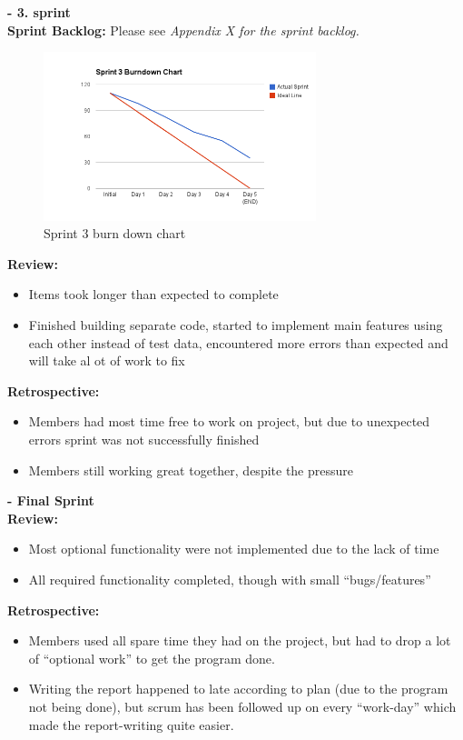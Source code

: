 \documentclass[11pt]{article}
\begin{document}
\textbf{- 3. sprint} \\

\textbf{Sprint Backlog:} Please see \emph{Appendix X for the sprint backlog.}
\begin{figure}[H]
  		\centering
    	\includegraphics[width=300px]{images/SCRUM/Sprint 3 burndown chart.png}
    	\caption{Sprint 3 burn down chart}
\end{figure}

     \textbf{Review:}
\begin{itemize}
\item Items took longer than expected to complete
\item Finished building separate code, started to implement main features using each other
       instead of test data, encountered more errors than expected and will take al ot of
       work to fix
\end{itemize}

     \textbf{Retrospective:}
\begin{itemize}
\item Members had most time free to work on project, but due to unexpected errors
       sprint was not successfully finished
\item Members still working great together, despite the pressure
\end{itemize}


\textbf{- Final Sprint} \\
\textbf{Review:}
\begin{itemize}
\item Most optional functionality were not implemented due to the lack of time
\item All required functionality completed, though with small ``bugs/features''
\end{itemize}

     \textbf{Retrospective:}
\begin{itemize}
\item Members used all spare time they had on the project, but had to drop
       a lot of ``optional work'' to get the program done.
\item Writing the report happened to late according to plan (due to the program
       not being done), but scrum has been followed up on every ``work-day''
       which made the report-writing quite easier.
\end{itemize}
\end{document}
